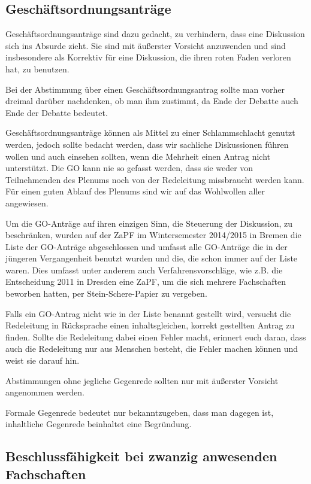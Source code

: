 \documentclass[
  a4paper,
  oneside]{scrartcl}
\begin{document}
\subsection*{Geschäftsordnungsanträge}\label{geschuxe4ftsordnungsantruxe4ge-1}

Geschäftsordnungsanträge sind dazu gedacht, zu verhindern, dass eine
Diskussion sich ins Absurde zieht. Sie sind mit äußerster Vorsicht
anzuwenden und sind insbesondere als Korrektiv für eine Diskussion, die
ihren roten Faden verloren hat, zu benutzen.

Bei der Abstimmung über einen Geschäftsordnungsantrag sollte man vorher
dreimal darüber nachdenken, ob man ihm zustimmt, da Ende der Debatte
auch Ende der Debatte bedeutet.

Geschäftsordnungsanträge können als Mittel zu einer Schlammschlacht
genutzt werden, jedoch sollte bedacht werden, dass wir sachliche
Diskussionen führen wollen und auch einsehen sollten, wenn die Mehrheit
einen Antrag nicht unterstützt. Die GO kann nie so gefasst werden, dass
sie weder von Teilnehmenden des Plenums noch von der Redeleitung
missbraucht werden kann. Für einen guten Ablauf des Plenums sind wir auf
das Wohlwollen aller angewiesen.

Um die GO-Anträge auf ihren einzigen Sinn, die Steuerung der Diskussion,
zu beschränken, wurden auf der ZaPF im Wintersemester 2014/2015 in
Bremen die Liste der GO-Anträge abgeschlossen und umfasst alle
GO-Anträge die in der jüngeren Vergangenheit benutzt wurden und die, die
schon immer auf der Liste waren. Dies umfasst unter anderem auch
Verfahrensvorschläge, wie z.B. die Entscheidung 2011 in Dresden eine
ZaPF, um die sich mehrere Fachschaften beworben hatten, per
Stein-Schere-Papier zu vergeben.

Falls ein GO-Antrag nicht wie in der Liste benannt gestellt wird,
versucht die Redeleitung in Rücksprache einen inhaltsgleichen, korrekt
gestellten Antrag zu finden. Sollte die Redeleitung dabei einen Fehler
macht, erinnert euch daran, dass auch die Redeleitung nur aus Menschen
besteht, die Fehler machen können und weist sie darauf hin.

Abstimmungen ohne jegliche Gegenrede sollten nur mit äußerster Vorsicht
angenommen werden.

Formale Gegenrede bedeutet nur bekanntzugeben, dass man dagegen ist,
inhaltliche Gegenrede beinhaltet eine Begründung.

\subsection*{Beschlussfähigkeit bei zwanzig anwesenden
Fachschaften}\label{beschlussfuxe4higkeit-bei-zwanzig-anwesenden-fachschaften}
\end{document}
